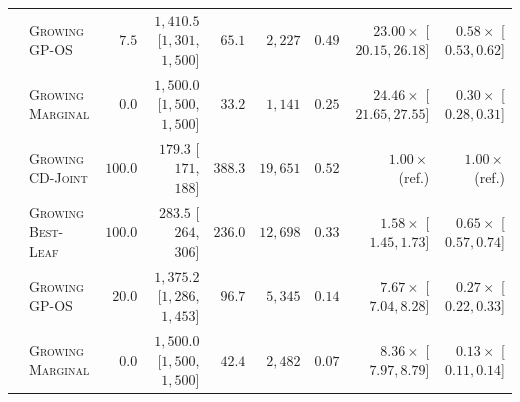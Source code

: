\documentclass{article}
\theoremstyle{plain}
\theoremstyle{definition}
\begin{document}
\begin{table}[!htbp]
{\begin{tabular}{@{}llrrrrrrr@{}}
  & \textsc{Growing GP-OS}     & $7.5$            & $1{,}410.5$ [$1{,}301$, $1{,}500$] & $65.1$          & $2{,}227$          & $0.49$ & $23.00\times$ [$20.15, 26.18$] & $0.58\times$ [$0.53, 0.62$] \\
  & \textsc{Growing Marginal}  & $0.0$            & $1{,}500.0$ [$1{,}500$, $1{,}500$] & $33.2$          & $1{,}141$          & $0.25$ & $24.46\times$ [$21.65, 27.55$] & $0.30\times$ [$0.28, 0.31$] \\
\midrule
{}
  & \textsc{Growing CD-Joint}  & $\mathbf{100.0}$ & $\mathbf{179.3}$ [$171$, $188$]  & $388.3$ & $19{,}651$ & $0.52$ & $1.00\times$ (ref.) & $1.00\times$ (ref.) \\
  & \textsc{Growing Best-Leaf} & $100.0$          & $283.5$ [$264$, $306$]           & $236.0$ & $12{,}698$ & $0.33$ & $\mathbf{1.58\times}$ [$1.45, 1.73$] & $0.65\times$ [$0.57, 0.74$] \\
  & \textsc{Growing GP-OS}     & $20.0$           & $1{,}375.2$ [$1{,}286$, $1{,}453$] & $96.7$  & $5{,}345$  & $0.14$ & $7.67\times$ [$7.04, 8.28$] & $0.27\times$ [$0.22, 0.33$] \\
  & \textsc{Growing Marginal}  & $0.0$            & $1{,}500.0$ [$1{,}500$, $1{,}500$] & $42.4$  & $2{,}482$  & $0.07$ & $8.36\times$ [$7.97, 8.79$] & $0.13\times$ [$0.11, 0.14$] \\
\bottomrule
\end{tabular}%
}
\end{table}
\end{document}
